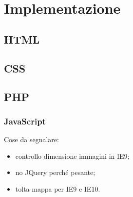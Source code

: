 \section{Implementazione}
\label{implementazione}

\subsection{HTML}
\label{implementazione-back-end-HTML}

\subsection{CSS}
\label{implementazione-front-end-CSS}

\subsection{PHP}
\label{implementazione-back-end-PHP}

\subsubsection{JavaScript}
\label{implementazione-front-end-JavaScript}
Cose da segnalare:
\begin{itemize}
	\item controllo dimensione immagini in IE9;
	\item no JQuery perché pesante;
	\item tolta mappa per IE9 e IE10.
\end{itemize}